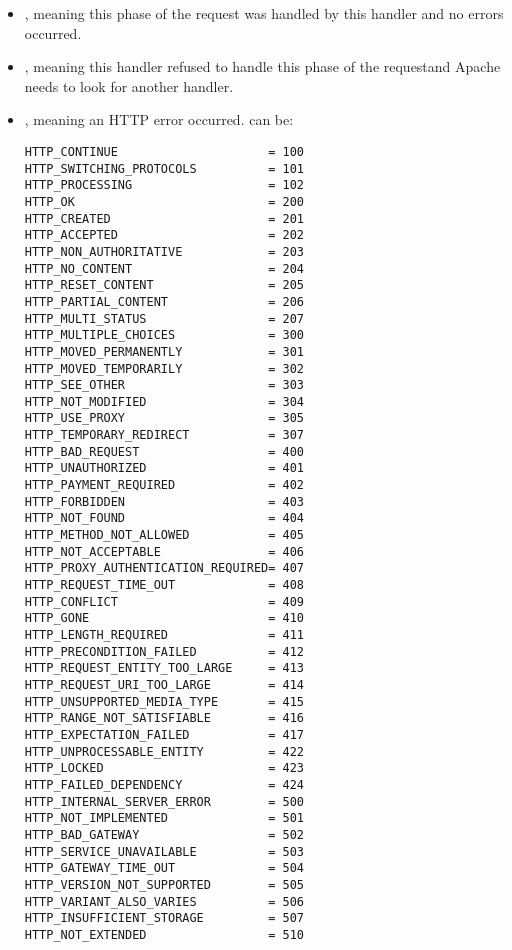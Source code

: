 \begin{itemize}

\item
{}, meaning this phase of the request was handled by this 
handler and no errors occurred. 

\item
{}, meaning this handler refused to handle this phase of 
the requestand Apache needs to look for another handler.
 
\item
{}, meaning an HTTP error occurred. 
 can be:

\begin{verbatim}
HTTP_CONTINUE                     = 100
HTTP_SWITCHING_PROTOCOLS          = 101
HTTP_PROCESSING                   = 102
HTTP_OK                           = 200
HTTP_CREATED                      = 201
HTTP_ACCEPTED                     = 202
HTTP_NON_AUTHORITATIVE            = 203
HTTP_NO_CONTENT                   = 204
HTTP_RESET_CONTENT                = 205
HTTP_PARTIAL_CONTENT              = 206
HTTP_MULTI_STATUS                 = 207
HTTP_MULTIPLE_CHOICES             = 300
HTTP_MOVED_PERMANENTLY            = 301
HTTP_MOVED_TEMPORARILY            = 302
HTTP_SEE_OTHER                    = 303
HTTP_NOT_MODIFIED                 = 304
HTTP_USE_PROXY                    = 305
HTTP_TEMPORARY_REDIRECT           = 307
HTTP_BAD_REQUEST                  = 400
HTTP_UNAUTHORIZED                 = 401
HTTP_PAYMENT_REQUIRED             = 402
HTTP_FORBIDDEN                    = 403
HTTP_NOT_FOUND                    = 404
HTTP_METHOD_NOT_ALLOWED           = 405
HTTP_NOT_ACCEPTABLE               = 406
HTTP_PROXY_AUTHENTICATION_REQUIRED= 407
HTTP_REQUEST_TIME_OUT             = 408
HTTP_CONFLICT                     = 409
HTTP_GONE                         = 410
HTTP_LENGTH_REQUIRED              = 411
HTTP_PRECONDITION_FAILED          = 412
HTTP_REQUEST_ENTITY_TOO_LARGE     = 413
HTTP_REQUEST_URI_TOO_LARGE        = 414
HTTP_UNSUPPORTED_MEDIA_TYPE       = 415
HTTP_RANGE_NOT_SATISFIABLE        = 416
HTTP_EXPECTATION_FAILED           = 417
HTTP_UNPROCESSABLE_ENTITY         = 422
HTTP_LOCKED                       = 423
HTTP_FAILED_DEPENDENCY            = 424
HTTP_INTERNAL_SERVER_ERROR        = 500
HTTP_NOT_IMPLEMENTED              = 501
HTTP_BAD_GATEWAY                  = 502
HTTP_SERVICE_UNAVAILABLE          = 503
HTTP_GATEWAY_TIME_OUT             = 504
HTTP_VERSION_NOT_SUPPORTED        = 505
HTTP_VARIANT_ALSO_VARIES          = 506
HTTP_INSUFFICIENT_STORAGE         = 507
HTTP_NOT_EXTENDED                 = 510
\end{verbatim}                      

\end{itemize}

